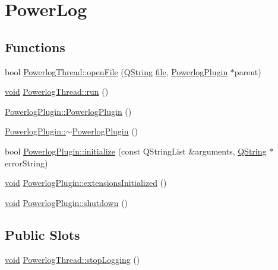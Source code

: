 \hypertarget{group___power_log}{\section{Power\-Log}
\label{group___power_log}
}
\subsection*{Functions}
\begin{DoxyCompactItemize}
\item 
bool \hyperlink{group___power_log_gac2181c168547833f7826354c333cd431}{Powerlog\-Thread\-::open\-File} (\hyperlink{group___u_a_v_objects_plugin_gab9d252f49c333c94a72f97ce3105a32d}{Q\-String} \hyperlink{uavobjecttemplate_8m_a97c04efa65bcf0928abf9260bc5cbf46}{file}, \hyperlink{class_powerlog_plugin}{Powerlog\-Plugin} $\ast$parent)
\item 
\hyperlink{group___u_a_v_objects_plugin_ga444cf2ff3f0ecbe028adce838d373f5c}{void} \hyperlink{group___power_log_ga8a04077cf7c30019689b894c73cb0020}{Powerlog\-Thread\-::run} ()
\item 
\hyperlink{group___power_log_ga9e38cb901b8c4d1f73f06f2b6e481e2e}{Powerlog\-Plugin\-::\-Powerlog\-Plugin} ()
\item 
\hyperlink{group___power_log_ga2556b7dd74c9d3c635c84f31a40269cd}{Powerlog\-Plugin\-::$\sim$\-Powerlog\-Plugin} ()
\item 
bool \hyperlink{group___power_log_gadc5a5af4c3942d0ec384cad6f677cef3}{Powerlog\-Plugin\-::initialize} (const Q\-String\-List \&arguments, \hyperlink{group___u_a_v_objects_plugin_gab9d252f49c333c94a72f97ce3105a32d}{Q\-String} $\ast$error\-String)
\item 
\hyperlink{group___u_a_v_objects_plugin_ga444cf2ff3f0ecbe028adce838d373f5c}{void} \hyperlink{group___power_log_gabdc836ec2b2a95cfe56fabe4d8c8e629}{Powerlog\-Plugin\-::extensions\-Initialized} ()
\item 
\hyperlink{group___u_a_v_objects_plugin_ga444cf2ff3f0ecbe028adce838d373f5c}{void} \hyperlink{group___power_log_gabcda6ddff409dc11244b3df09276d0cc}{Powerlog\-Plugin\-::shutdown} ()
\end{DoxyCompactItemize}
\subsection*{Public Slots}
\begin{DoxyCompactItemize}
\item 
\hyperlink{group___u_a_v_objects_plugin_ga444cf2ff3f0ecbe028adce838d373f5c}{void} \hyperlink{group___power_log_ga9a391d6c905ecddc9bbc2dd34f055d7c}{Powerlog\-Thread\-::stop\-Logging} ()
\end{DoxyCompactItemize}


